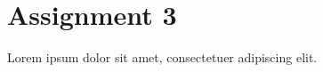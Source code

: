 \documentclass{article}
\begin{document}
\section{Assignment 3}
\label{sec:assignment3}

Lorem ipsum dolor sit amet, consectetuer adipiscing elit. 
\end{document}

